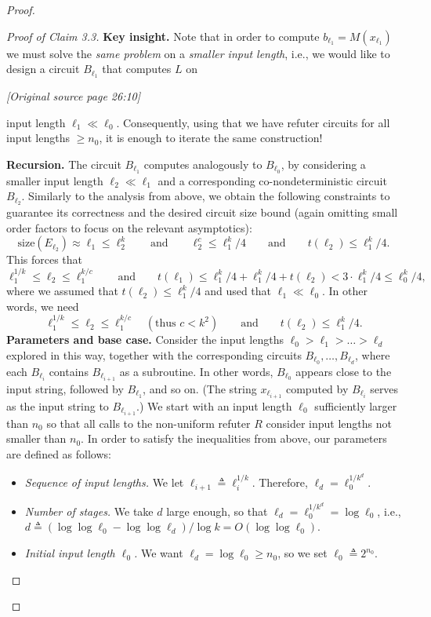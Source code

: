 \documentclass[11pt]{article}
\newcommand{\size}{\mathrm{size}}
\newcommand{\sourcepage}[1]{\par\Needspace{5\baselineskip}\bigskip\noindent\textit{[Original source page 26:#1]}\par\medskip}
\begin{document}
\begin{proof}
\begin{proof}[Proof of Claim 3.3]
\noindent\textbf{Key insight.} Note that in order to compute $b_{\ell_1}=M(x_{\ell_1})$ we must solve the \emph{same problem} on a \emph{smaller input length}, i.e., we would like to design a circuit $B_{\ell_1}$ that computes $L$ on

\sourcepage{10}
input length $\ell_1\ll\ell_0$. Consequently, using that we have refuter circuits for all input lengths $\ge n_0$, it is enough to iterate the same construction!

\noindent\textbf{Recursion.} The circuit $B_{\ell_1}$ computes analogously to $B_{\ell_0}$, by considering a smaller input length $\ell_2\ll\ell_1$ and a corresponding co-nondeterministic circuit $B_{\ell_2}$. Similarly to the analysis from above, we obtain the following constraints to guarantee its correctness and the desired circuit size bound (again omitting small order factors to focus on the relevant asymptotics):
\[
\size(E_{\ell_2})\approx\ell_1\le\ell_2^k\qquad\text{and}\qquad\ell_2^c\le\ell_1^k/4\qquad\text{and}\qquad t(\ell_2)\le\ell_1^k/4.
\]
This forces that
\[
\ell_1^{1/k}\le\ell_2\le\ell_1^{k/c}\qquad\text{and}\qquad
t(\ell_1)\le\ell_1^k/4+\ell_1^k/4+t(\ell_2)<3\cdot\ell_1^k/4\le\ell_0^k/4,
\]
where we assumed that $t(\ell_2)\le\ell_1^k/4$ and used that $\ell_1\ll\ell_0$. In other words, we need
\[
\ell_1^{1/k}\le\ell_2\le\ell_1^{k/c}\quad(\text{thus }c<k^2)\qquad\text{and}\qquad t(\ell_2)\le\ell_1^k/4.
\]
\noindent\textbf{Parameters and base case.} Consider the input lengths $\ell_0>\ell_1>\ldots>\ell_d$ explored in this way, together with the corresponding circuits $B_{\ell_0},\ldots,B_{\ell_d}$, where each $B_{\ell_i}$ contains $B_{\ell_{i+1}}$ as a subroutine. In other words, $B_{\ell_0}$ appears close to the input string, followed by $B_{\ell_1}$, and so on. (The string $x_{\ell_{i+1}}$ computed by $B_{\ell_i}$ serves as the input string to $B_{\ell_{i+1}}$.) We start with an input length $\ell_0$ sufficiently larger than $n_0$ so that all calls to the non-uniform refuter $R$ consider input lengths not smaller than $n_0$. In order to satisfy the inequalities from above, our parameters are defined as follows:
\begin{itemize}[label=--]
\item \emph{Sequence of input lengths.} We let $\ell_{i+1}\triangleq\ell_i^{1/k}$. Therefore, $\ell_d=\ell_0^{1/k^d}$.
\item \emph{Number of stages.} We take $d$ large enough, so that $\ell_d=\ell_0^{1/k^d}=\log\ell_0$, i.e., $d\triangleq(\log\log\ell_0-\log\log\ell_d)/\log k=O(\log\log\ell_0)$.
\item \emph{Initial input length $\ell_0$.} We want $\ell_d=\log\ell_0\ge n_0$, so we set $\ell_0\triangleq2^{n_0}$.

\end{itemize}
\end{proof}
\end{proof}
\end{document}
